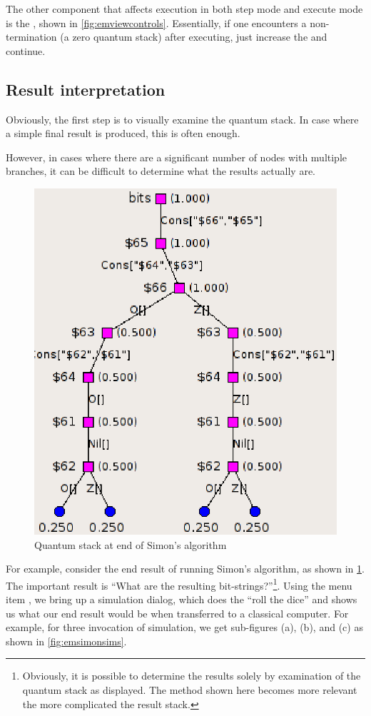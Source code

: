 The other component that affects execution in both  step mode and 
execute mode is the , shown 
in \ref{fig:emviewcontrols}. Essentially, if one encounters a 
non-termination (a zero quantum stack) after executing, just increase the 
 and continue.

\subsection{Result interpretation}
Obviously, the first step is to visually examine the quantum stack. In case
where a simple final result is produced, this is often enough.

However, in cases where there are a significant number of nodes with multiple
branches, it can be difficult to determine what the results actually are.

\begin{figure}[htbp]
\centering
\includegraphics[scale=.75]{images/emulator/SimonsResult.eps}
\caption{Quantum stack at end of Simon's algorithm}\label{fig:emsimonsresult}
\end{figure}

For example, consider the end result of running Simon's algorithm, as shown
in \ref{fig:emsimonsresult}. The important result is ``What are the 
resulting bit-strings?''\footnote{Obviously, it is possible to determine 
the results solely by examination of the quantum stack as displayed. The 
method shown here becomes more relevant the more complicated the 
result stack.}. Using the menu item , we
bring up a simulation dialog, which does the ``roll the dice'' and 
shows us what our end result would be when transferred to a classical
computer. For example, for three invocation of simulation, we 
get sub-figures (a), (b), and (c) as shown in \ref{fig:emsimonsims}.

